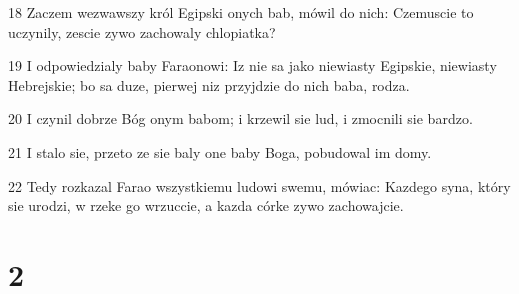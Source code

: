 \par 18 Zaczem wezwawszy król Egipski onych bab, mówil do nich: Czemuscie to uczynily, zescie zywo zachowaly chlopiatka?
\par 19 I odpowiedzialy baby Faraonowi: Iz nie sa jako niewiasty Egipskie, niewiasty Hebrejskie; bo sa duze, pierwej niz przyjdzie do nich baba, rodza.
\par 20 I czynil dobrze Bóg onym babom; i krzewil sie lud, i zmocnili sie bardzo.
\par 21 I stalo sie, przeto ze sie baly one baby Boga, pobudowal im domy.
\par 22 Tedy rozkazal Farao wszystkiemu ludowi swemu, mówiac: Kazdego syna, który sie urodzi, w rzeke go wrzuccie, a kazda córke zywo zachowajcie.

\chapter{2}

